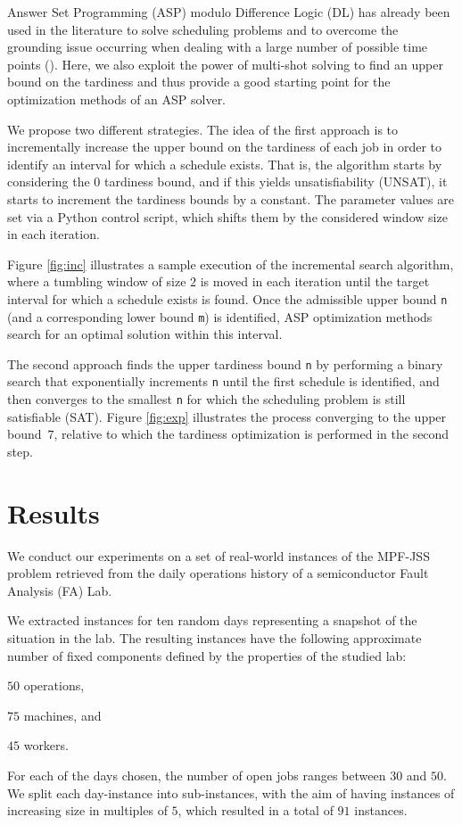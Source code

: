 \documentclass[submission,copyright,creativecommons]{eptcs}
\newcommand{\jss}{MPF-JSS\xspace}
\begin{document}
Answer Set Programming (ASP) modulo Difference Logic (DL) has already been used in the literature to solve scheduling problems and to overcome the grounding issue occurring when dealing with a large number of possible time points (\cite{DBLP:conf/lpnmr/AbelsJOSTW19}). Here, we also exploit the power of multi-shot solving to find an upper bound on the tardiness and thus provide a good starting point for the optimization methods of an ASP solver. 

We propose two different strategies. The idea of the first approach is to incrementally increase the upper bound on the tardiness of each job in order to identify an interval for which a schedule exists.
%
That is, the algorithm starts by considering the $0$ tardiness bound, and if this yields unsatisfiability (UNSAT), it starts to increment the tardiness bounds by a constant. The parameter values are set via a Python control script, which shifts them by the considered window size in each iteration. 



Figure \ref{fig:inc} illustrates a sample execution of the incremental search algorithm, where a tumbling window of size $2$ is moved in each iteration until the target interval for which a schedule exists is found. Once the admissible upper bound \lstinline{n} (and a corresponding lower bound \lstinline{m}) is identified, ASP optimization methods search for an optimal solution within this interval.

The second approach finds the upper tardiness bound \lstinline{n} by performing a binary search that exponentially increments \lstinline{n} until the first schedule is identified, and then converges to the smallest \lstinline{n} for which the scheduling problem is still satisfiable (SAT). Figure \ref{fig:exp} illustrates the process converging to the upper bound~$7$, relative to which the tardiness optimization is performed in the second step.

\section{Results}

We conduct our experiments on a set of real-world instances of the \jss problem retrieved from the daily operations history of a semiconductor Fault Analysis (FA) Lab.%

We extracted instances for ten random days representing a snapshot of the situation in the lab. The resulting instances have the following approximate number of fixed components defined by the properties of the studied lab:
\begin{enumerate*}[label=\emph{(\roman*)}]
	\item $50$ operations,
	\item $75$ machines, and 
	\item $45$ workers.
\end{enumerate*}
For each of the days chosen, the number of open jobs ranges between $30$ and $50$. We split each day-instance into sub-instances, with the aim of having instances of increasing size in multiples of $5$, which resulted in a total of $91$ instances.
\end{document}
